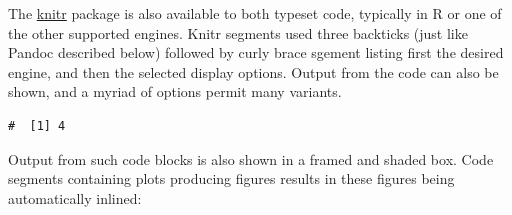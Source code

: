 \documentclass[letterpaper,9pt,twocolumn,twoside,]{pinp}
\begin{document}
The \href{https://cran.r-project.org/package=pinp}{knitr} package
\citep{CRAN:knitr} is also available to both typeset code, typically in
R or one of the other supported engines. Knitr segments used three
backticks (just like Pandoc described below) followed by curly brace
sgement listing first the desired engine, and then the selected display
options. Output from the code can also be shown, and a myriad of options
permit many variants.

\begin{Shaded}
\begin{Highlighting}[]
\OtherTok{\textless{}{-}}  \SpecialCharTok{+} 
\end{Highlighting}
\end{Shaded}

\begin{ShadedResult}
\begin{verbatim}
#  [1] 4
\end{verbatim}
\end{ShadedResult}

Output from such code blocks is also shown in a framed and shaded box.
Code segments containing plots producing figures results in these
figures being automatically inlined:

\begin{Shaded}
\begin{Highlighting}[]
\NormalTok{(}\NormalTok{)}
\NormalTok{(}\NormalTok{(}\NormalTok{,}\NormalTok{,}\NormalTok{,}\NormalTok{))}
\NormalTok{(}\NormalTok{(}\NormalTok{(}\NormalTok{)), }\NormalTok{,}
     \NormalTok{)}
\end{Highlighting}
\end{Shaded}
\end{document}
